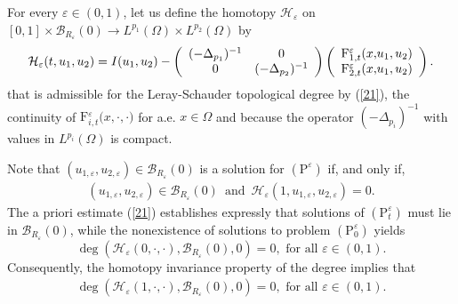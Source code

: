 \documentclass[11pt]{amsart}
\theoremstyle{definition}
\theoremstyle{remark}
\numberwithin{equation}{section}
\begin{document}
For every $\varepsilon \in (0,1)$, let us define the homotopy $\mathcal{H}%
_{\varepsilon }$ on $[0,1]\times \mathcal{B}_{R_{\varepsilon
}}(0)\rightarrow L^{p_{1}}(\Omega )\times L^{p_{2}}(\Omega )$ by%
\begin{equation*}
\mathcal{H}_{\varepsilon }(t,u_{1},u_{2})=I(u_{1},u_{2})-\left( 
\begin{array}{cc}
(-\Delta _{p_{1}})^{-1} & 0 \\ 
0 & (-\Delta _{p_{2}})^{-1}%
\end{array}%
\right) \left( 
\begin{array}{l}
\mathrm{F}_{1,t}^{\varepsilon }({x,}u_{1},u_{2}) \\ 
\multicolumn{1}{c}{\mathrm{F}_{2,t}^{\varepsilon }({x,}u_{1},u_{2})}%
\end{array}%
\right) .
\end{equation*}%
that is admissible for the Leray-Schauder topological degree by (\ref{21}),
the continuity of $\mathrm{F}{_{i,t}^{\varepsilon }(x},\cdot ,\cdot )$ for
a.e. $x\in \Omega $ and because the operator $(-\Delta _{p_{i}})^{-1}$ with
values in $L^{p_{i}}(\Omega )$ is compact.

Note that $(u_{1,\varepsilon },u_{2,\varepsilon })\in \mathcal{B}%
_{R_{\varepsilon }}(0)$ is a solution for $(\mathrm{P}^{\varepsilon })$ if,
and only if, 
\begin{equation*}
\begin{array}{c}
(u_{1,\varepsilon },u_{2,\varepsilon })\in \mathcal{B}_{R_{\varepsilon
}}(0)\,\,\,\mbox{and}\,\,\,\mathcal{H}_{\varepsilon }(1,u_{1,\varepsilon
},u_{2,\varepsilon })=0.%
\end{array}%
\end{equation*}%
The a priori estimate (\ref{21}) establishes expressly that solutions of $(%
\mathrm{P}_{t}^{\varepsilon })$ must lie in $\mathcal{B}_{R_{\varepsilon
}}(0)$, while the nonexistence of solutions to problem $(\mathrm{P}%
_{0}^{\varepsilon })$ yields 
\begin{equation*}
\deg \left( \mathcal{H}_{\varepsilon }(0,\cdot ,\cdot ),\mathcal{B}
_{R_{\varepsilon }}(0),0\right) =0,\text{ for all }\varepsilon \in (0,1).
\end{equation*}%
Consequently, the homotopy invariance property of the degree implies that 
\begin{equation}
\begin{array}{c}
\deg \left( \mathcal{H}_{\varepsilon }(1,\cdot ,\cdot ),\mathcal{B}
_{R_{\varepsilon }}(0),0\right) =0,\text{ for all }\varepsilon \in (0,1).%
\end{array}
\label{22}
\end{equation}
\end{document}
